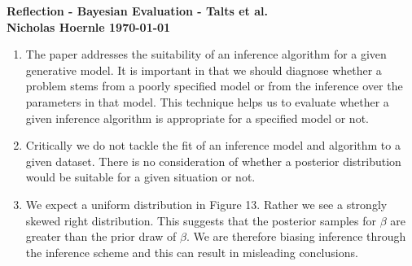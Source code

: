 \documentclass[twoside]{article}
\begin{document}
\textbf{Reflection - Bayesian Evaluation - Talts et al.}\\
\textbf{Nicholas Hoernle \hfill \today}

\begin{enumerate}
\item The paper addresses the suitability of an inference algorithm for a given generative model. It is important in that we should diagnose whether a problem stems from a poorly specified model or from the inference over the parameters in that model. This technique helps us to evaluate whether a given inference algorithm is appropriate for a specified model or not.
\item Critically we do not tackle the fit of an inference model and algorithm to a given dataset. There is no consideration of whether a posterior distribution would be suitable for a given situation or not.
\item We expect a uniform distribution in Figure 13. Rather we see a strongly skewed right distribution. This suggests that the posterior samples for $\beta$ are greater than the prior draw of $\beta$. We are therefore biasing inference through the inference scheme and this can result in misleading conclusions.
\end{enumerate}
\end{document}
